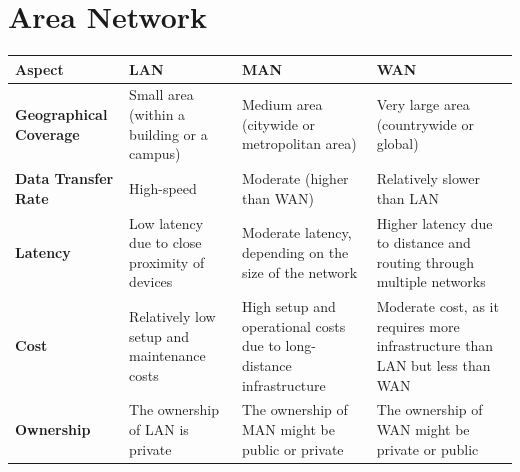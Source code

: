\section{Area Network}
\begin{table}[th]
   \begin{tabularx}{\textwidth}{|l|L|L|L|}
      \hline
      \textbf{Aspect} &
      \textbf{LAN} &
      \textbf{MAN} &
      \textbf{WAN} \\\hline

      \textbf{Geographical Coverage} &
      Small area (within a building or a campus) &
      Medium area (citywide or metropolitan area) &
      Very large area (countrywide or global) \\\hline

      \textbf{Data Transfer Rate} &
      High-speed &
      Moderate (higher than WAN) &
      Relatively slower than LAN \\\hline

      \textbf{Latency} &
      Low latency due to close proximity of devices &
      Moderate latency, depending on the size of the network &
      Higher latency due to distance and routing through multiple networks \\\hline

      \textbf{Cost} &
      Relatively low setup and maintenance costs &
      High setup and operational costs due to long-distance infrastructure &
      Moderate cost, as it requires more infrastructure than LAN but less than WAN \\\hline

      \textbf{Ownership} &
      The ownership of LAN is private &
      The ownership of MAN might be public or private &
      The ownership of WAN might be private or public \\\hline
   \end{tabularx}
\end{table}


